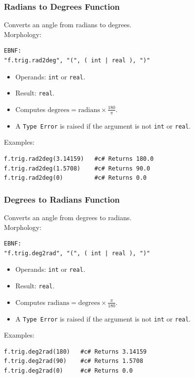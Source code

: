 \subsubsection{Radians to Degrees Function}
Converts an angle from radians to degrees. \\
Morphology:
\begin{verbatim}
EBNF:
"f.trig.rad2deg", "(", ( int | real ), ")"
\end{verbatim}
\begin{itemize}
\item Operands: \texttt{int} or \texttt{real}.
\item Result: \texttt{real}.
\item Computes $\text{degrees} = \text{radians} \times \frac{180}{\pi}$.
\item A \texttt{Type Error} is raised if the argument is not \texttt{int} or \texttt{real}.
\end{itemize}
Examples:
\begin{verbatim}
f.trig.rad2deg(3.14159)   #c# Returns 180.0
f.trig.rad2deg(1.5708)    #c# Returns 90.0
f.trig.rad2deg(0)         #c# Returns 0.0
\end{verbatim}

\subsubsection{Degrees to Radians Function}
Converts an angle from degrees to radians. \\
Morphology:
\begin{verbatim}
EBNF:
"f.trig.deg2rad", "(", ( int | real ), ")"
\end{verbatim}
\begin{itemize}
\item Operands: \texttt{int} or \texttt{real}.
\item Result: \texttt{real}.
\item Computes $\text{radians} = \text{degrees} \times \frac{\pi}{180}$.
\item A \texttt{Type Error} is raised if the argument is not \texttt{int} or \texttt{real}.
\end{itemize}
Examples:
\begin{verbatim}
f.trig.deg2rad(180)   #c# Returns 3.14159
f.trig.deg2rad(90)    #c# Returns 1.5708
f.trig.deg2rad(0)     #c# Returns 0.0
\end{verbatim}

